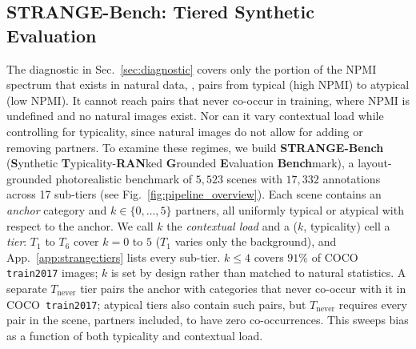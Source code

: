 \subsection{STRANGE-Bench: Tiered Synthetic Evaluation}
\label{sec:strange}
\vspace{-5.0pt}
The diagnostic in Sec.~\ref{sec:diagnostic} covers only the portion of the NPMI spectrum that exists in natural data, \ie, pairs from typical (high NPMI) to atypical (low NPMI). It cannot reach pairs that never co-occur in training, where NPMI is undefined and no natural images exist. Nor can it vary contextual load while controlling for typicality, since natural images do not allow for adding or removing partners. To examine these regimes, we build \textbf{STRANGE-Bench} (\textbf{S}ynthetic \textbf{T}ypicality-\textbf{RAN}ked \textbf{G}rounded \textbf{E}valuation \textbf{Bench}mark), a layout-grounded photorealistic benchmark of $5{,}523$ scenes with $17{,}332$ annotations across 17 sub-tiers (see Fig.~\ref{fig:pipeline_overview}). Each scene contains an \emph{anchor} category and $k \in \{0, \dots, 5\}$ partners, all uniformly typical or atypical with respect to the anchor. We call $k$ the \emph{contextual load} and a ($k$, typicality) cell a \emph{tier}: $T_1$ to $T_6$ cover $k = 0$ to $5$ ($T_1$ varies only the background), and App.~\ref{app:strange:tiers} lists every sub-tier. $k \le 4$ covers $91\%$ of COCO \texttt{train2017} images; $k$ is set by design rather than matched to natural statistics. A separate $T_{\text{never}}$ tier pairs the anchor with categories that never co-occur with it in COCO~\texttt{train2017}; atypical tiers also contain such pairs, but $T_{\text{never}}$ requires every pair in the scene, partners included, to have zero co-occurrences. This sweeps bias as a function of both typicality and contextual load.



